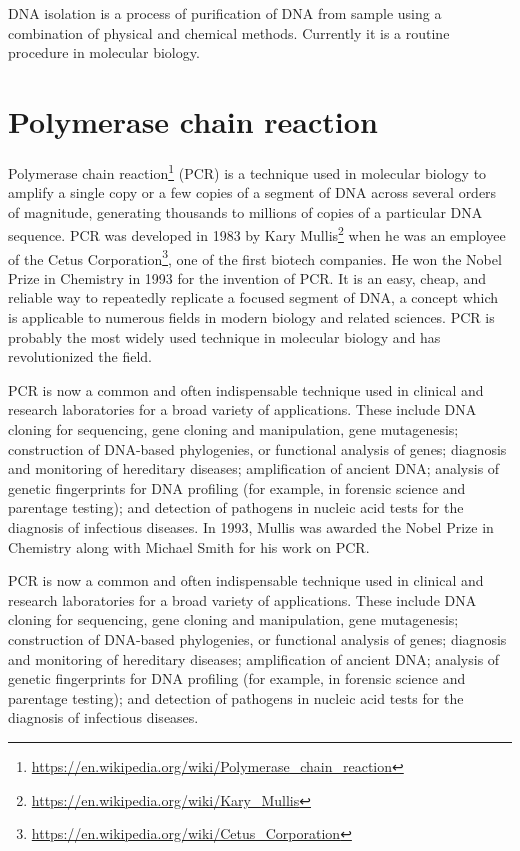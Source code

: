 \documentclass[]{book}
\let\rmarkdownfootnote\footnote%
\def\footnote{\protect\rmarkdownfootnote}
\renewcommand{\href}[2]{#2\footnote{\url{#1}}}
\theoremstyle{definition}
\theoremstyle{definition}
\theoremstyle{definition}
\theoremstyle{remark}
\begin{document}
DNA isolation is a process of purification of DNA from sample using a
combination of physical and chemical methods. Currently it is a routine
procedure in molecular biology.

\section{Polymerase chain reaction}\label{polymerase-chain-reaction}

\href{https://en.wikipedia.org/wiki/Polymerase_chain_reaction}{Polymerase
chain reaction} (PCR) is a technique used in molecular biology to
amplify a single copy or a few copies of a segment of DNA across several
orders of magnitude, generating thousands to millions of copies of a
particular DNA sequence. PCR was developed in 1983 by
\href{https://en.wikipedia.org/wiki/Kary_Mullis}{Kary Mullis} when he
was an employee of the
\href{https://en.wikipedia.org/wiki/Cetus_Corporation}{Cetus
Corporation}, one of the first biotech companies. He won the Nobel Prize
in Chemistry in 1993 for the invention of PCR. It is an easy, cheap, and
reliable way to repeatedly replicate a focused segment of DNA, a concept
which is applicable to numerous fields in modern biology and related
sciences. PCR is probably the most widely used technique in molecular
biology and has revolutionized the field.

PCR is now a common and often indispensable technique used in clinical
and research laboratories for a broad variety of applications. These
include DNA cloning for sequencing, gene cloning and manipulation, gene
mutagenesis; construction of DNA-based phylogenies, or functional
analysis of genes; diagnosis and monitoring of hereditary diseases;
amplification of ancient DNA; analysis of genetic fingerprints for DNA
profiling (for example, in forensic science and parentage testing); and
detection of pathogens in nucleic acid tests for the diagnosis of
infectious diseases. In 1993, Mullis was awarded the Nobel Prize in
Chemistry along with Michael Smith for his work on PCR.

PCR is now a common and often indispensable technique used in clinical
and research laboratories for a broad variety of applications. These
include DNA cloning for sequencing, gene cloning and manipulation, gene
mutagenesis; construction of DNA-based phylogenies, or functional
analysis of genes; diagnosis and monitoring of hereditary diseases;
amplification of ancient DNA; analysis of genetic fingerprints for DNA
profiling (for example, in forensic science and parentage testing); and
detection of pathogens in nucleic acid tests for the diagnosis of
infectious diseases.
\end{document}
